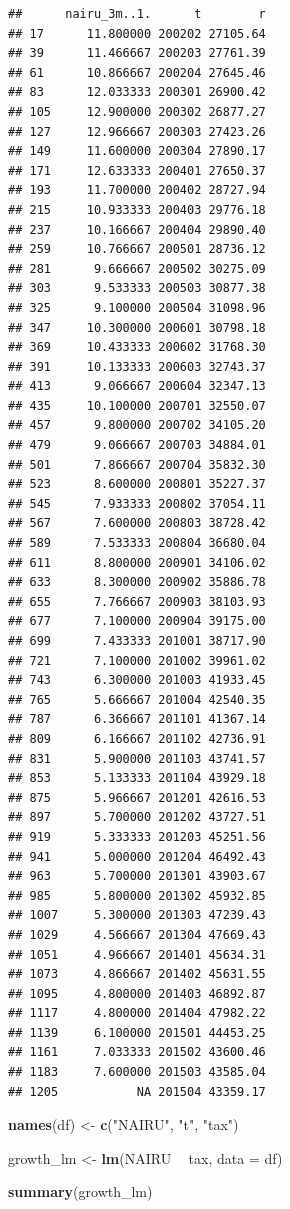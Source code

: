 \documentclass[
]{article}
\newenvironment{Shaded}{\begin{snugshade}}{\end{snugshade}}
\newcommand{\DataTypeTok}[1]{\textcolor[rgb]{0.13,0.29,0.53}{#1}}
\newcommand{\KeywordTok}[1]{\textcolor[rgb]{0.13,0.29,0.53}{\textbf{#1}}}
\newcommand{\NormalTok}[1]{#1}
\newcommand{\OperatorTok}[1]{\textcolor[rgb]{0.81,0.36,0.00}{\textbf{#1}}}
\newcommand{\StringTok}[1]{\textcolor[rgb]{0.31,0.60,0.02}{#1}}
\begin{document}
\begin{verbatim}
##      nairu_3m..1.      t        r
## 17      11.800000 200202 27105.64
## 39      11.466667 200203 27761.39
## 61      10.866667 200204 27645.46
## 83      12.033333 200301 26900.42
## 105     12.900000 200302 26877.27
## 127     12.966667 200303 27423.26
## 149     11.600000 200304 27890.17
## 171     12.633333 200401 27650.37
## 193     11.700000 200402 28727.94
## 215     10.933333 200403 29776.18
## 237     10.166667 200404 29890.40
## 259     10.766667 200501 28736.12
## 281      9.666667 200502 30275.09
## 303      9.533333 200503 30877.38
## 325      9.100000 200504 31098.96
## 347     10.300000 200601 30798.18
## 369     10.433333 200602 31768.30
## 391     10.133333 200603 32743.37
## 413      9.066667 200604 32347.13
## 435     10.100000 200701 32550.07
## 457      9.800000 200702 34105.20
## 479      9.066667 200703 34884.01
## 501      7.866667 200704 35832.30
## 523      8.600000 200801 35227.37
## 545      7.933333 200802 37054.11
## 567      7.600000 200803 38728.42
## 589      7.533333 200804 36680.04
## 611      8.800000 200901 34106.02
## 633      8.300000 200902 35886.78
## 655      7.766667 200903 38103.93
## 677      7.100000 200904 39175.00
## 699      7.433333 201001 38717.90
## 721      7.100000 201002 39961.02
## 743      6.300000 201003 41933.45
## 765      5.666667 201004 42540.35
## 787      6.366667 201101 41367.14
## 809      6.166667 201102 42736.91
## 831      5.900000 201103 43741.57
## 853      5.133333 201104 43929.18
## 875      5.966667 201201 42616.53
## 897      5.700000 201202 43727.51
## 919      5.333333 201203 45251.56
## 941      5.000000 201204 46492.43
## 963      5.700000 201301 43903.67
## 985      5.800000 201302 45932.85
## 1007     5.300000 201303 47239.43
## 1029     4.566667 201304 47669.43
## 1051     4.966667 201401 45634.31
## 1073     4.866667 201402 45631.55
## 1095     4.800000 201403 46892.87
## 1117     4.800000 201404 47982.22
## 1139     6.100000 201501 44453.25
## 1161     7.033333 201502 43600.46
## 1183     7.600000 201503 43585.04
## 1205           NA 201504 43359.17
\end{verbatim}

\begin{Shaded}
\begin{Highlighting}[]
\KeywordTok{names}\NormalTok{(df) <-}\StringTok{ }\KeywordTok{c}\NormalTok{(}\StringTok{"NAIRU"}\NormalTok{, }\StringTok{"t"}\NormalTok{, }\StringTok{"tax"}\NormalTok{)}

\NormalTok{growth_lm <-}\StringTok{ }\KeywordTok{lm}\NormalTok{(NAIRU }\OperatorTok{~}\StringTok{ }\NormalTok{tax, }\DataTypeTok{data =}\NormalTok{ df)}

\KeywordTok{summary}\NormalTok{(growth_lm)}
\end{Highlighting}
\end{Shaded}
\end{document}
